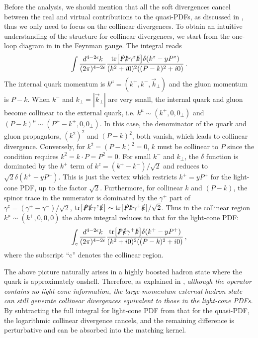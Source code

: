 Before the analysis, we should mention that all the soft divergences cancel between the real and virtual contributions to the quasi-PDFs, as discussed in , thus we only need to focus on the collinear divergences. To obtain an intuitive understanding of the structure for collinear divergences, we start from the one-loop diagram in  in the Feynman gauge. The integral reads
\begin{align}
	\int \frac{d^{4-2\epsilon}k}{(2\pi)^{4-2\epsilon}}\frac{{\rm tr}\big[\slashed{P}\slashed{k}\gamma^z\slashed{k}\big]\delta(k^z-yP^z)}{(k^2+i0)^2((P-k)^2+i0)}\,.
\end{align}
The internal quark momentum is $k^\mu = (k^+,k^-,\vec{k}_\perp)$ and the gluon momentum is $P-k$. When $k^-$ and $k_\perp=|\vec{k}_\perp|$ are very small, the internal quark and gluon become collinear to the external quark, i.e. $k^{\mu}\sim (k^+,0,0_\perp)$ and $(P-k)^{\mu}\sim (P^+-k^+,0,0_\perp)$. In this case, the denominator of the quark and gluon propagators, $(k^2)^2$ and $(P-k)^2$, both vanish, which leads to collinear divergence. Conversely, for $k^2=(P-k)^2=0$, $k$ must be collinear to $P$ since the condition requires $k^2=k\cdot P=P^2=0$. For small $k^-$ and $k_\perp$, the $\delta$ function is dominated by the $k^+$ term of $k^z=(k^+-k^-)/\sqrt{2}$ and reduces to $\sqrt{2}\delta(k^+-yP^+)$. This is just the vertex which restricts $k^+=yP^+$ for the light-cone PDF, up to the factor $\sqrt{2}$. Furthermore, for collinear $k$ and $(P-k)$, the spinor trace in the numerator is dominated by the $\gamma^+$ part of $\gamma^z=(\gamma^+-\gamma^-)/\sqrt{2}$, ${\rm tr}\big[\slashed{P}\slashed{k}\gamma^z\slashed{k}\big] \sim {\rm tr}\big[\slashed{P}\slashed{k}\gamma^+\slashed{k}\big]/\sqrt{2}$. Thus in the collinear region $k^{\mu}\sim (k^+,0,0,0)$ the above integral reduces to that for the light-cone PDF:
\begin{align}
	\int_{\rm c} \frac{d^{4-2\epsilon}k}{(2\pi)^{4-2\epsilon}}\frac{{\rm tr}\big[\slashed{P}\slashed{k}\gamma^+\slashed{k}\big]\delta(k^+-yP^+) }{(k^2+i0)^2((P-k)^2+i0)}\,,
\end{align}
where the subscript ``c'' denotes the collinear region.

The above picture naturally arises in a highly boosted hadron state where the quark is approximately onshell.
Therefore, as explained in ,  {\it although the operator contains no light-cone information, the large-momentum external hadron state can still generate collinear divergences equivalent to those in the light-cone PDFs.} By subtracting the full integral for light-cone PDF from that for the quasi-PDF, the logarithmic collinear divergence cancels, and the remaining difference is perturbative and can be absorbed into the matching kernel.

